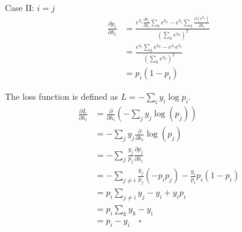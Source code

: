 \documentclass{article}
\begin{document}
Case II: \(i=j\)
\begin{align*}
    \frac{\partial p_i}{\partial h_i} & =\frac{e^{h_i}\frac{\partial h_i}{\partial h_i} \sum_k e^{h_k}-e^{h_i}\sum_k{\frac{\partial (e^{h_k})}{\partial h_i}}}{\left( \sum_k e^{h_k} \right)^2} \\
                                      & =\frac{e^{h_i}\sum_k e^{h_k}-e^{h_i}e^{h_i}}{\left( \sum_k e^{h_k} \right)^2}                                                                           \\
                                      & =p_i(1-p_i)
\end{align*}

The loss function is defined as \(L=-\sum_i y_i \log p_i\).
\begin{align*}
    \frac{\partial L}{\partial h_i} & = \frac{\partial}{\partial h_i}\left( -\sum_j y_j \log(p_j) \right)       \\
                                    & = -\sum_j y_j \frac{\partial}{\partial h_i}\log(p_j)                      \\
                                    & = -\sum_j \frac{y_j}{p_j}\frac{\partial p_j}{\partial h_i}                \\
                                    & = -\sum_{j\neq i} \frac{y_j}{p_j} (-p_i p_j) - \frac{y_i}{p_i} p_i(1-p_i) \\
                                    & = p_i \sum_{j\neq i} y_j - y_i + y_i p_i\\
                                    &= p_i \sum_k y_k - y_i\\
                                    &= p_i-y_i \quad \square
\end{align*}
\end{document}
